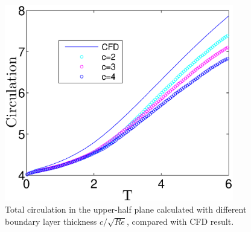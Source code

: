 \begin{figure}
\begin{center}
\includegraphics[width=10cm]{./Figures/Circulation.eps}
\end{center}
\caption[Total circulation in the upper-half plane]{Total circulation in the upper-half plane calculated with different boundary layer thickness $c/\sqrt{Re}$, compared with CFD result.}
\label{fig:Circulation}
\end{figure}

